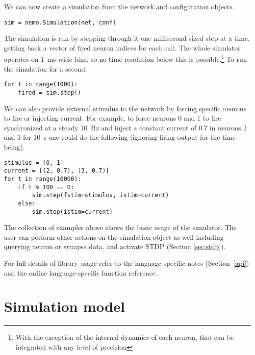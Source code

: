 \documentclass[a4paper]{article}
\newenvironment{mintframe}
  {\begin{mdframed}[linecolor=black, topline=true, bottomline=true,
    leftline=false, rightline=false, backgroundcolor=yellow!13!white,
    nobreak=true]
  }{
  \end{mdframed}
}
\begin{document}
We can now create a simulation from the network and configuration
objects.

\begin{mintframe}
\begin{verbatim}
sim = nemo.Simulation(net, conf)
\end{verbatim}
\end{mintframe}

The simulation is run by stepping through it one millisecond-sized step at a
time, getting back a vector of fired neuron indices for each call. The whole
simulator operates on \SI{1}{\milli \second}-wide bins, so no time resolution
below this is possible.\footnote{With the exception of the internal dynamics of
each neuron, that can be integrated with any level of precision} To run the
simulation for a second:

\begin{mintframe}
\begin{verbatim}
for t in range(1000):
    fired = sim.step()
\end{verbatim}
\end{mintframe}

We can also provide external stimulus to the network by forcing specific
neurons to fire or injecting current. For example, to force neurons 0 and 1 to
fire synchronized at a steady \SI{10}{\hertz} and inject a constant current of
0.7 in neurons 2 and 3 for \SI{10}{\second} one could do the following
(ignoring firing output for the time being):

\begin{verbatim}
stimulus = [0, 1]
current = [(2, 0.7), (3, 0.7)]
for t in range(10000):
    if t % 100 == 0:
        sim.step(fstim=stimulus, istim=current)
    else:
        sim.step(istim=current)
\end{verbatim}

The collection of examples above shows the basic usage of the simulator. The
user can perform other actions on the simulation object as well including
querying neuron or synapse data, and activate STDP (Section \ref{sec:stdp}).

For full details of library usage refer to the language-specific notes
(Section~\ref{api}) and the online language-specific function reference.


\section{Simulation model}
\label{model}
\end{document}
